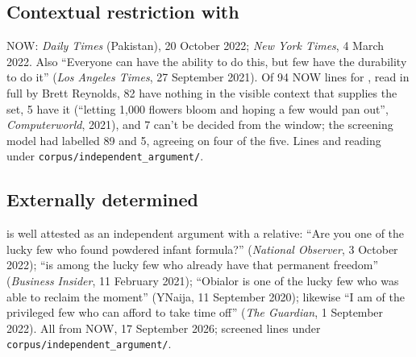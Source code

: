 \documentclass[12pt]{article}
\begin{document}
\subsection{Contextual restriction with }

NOW: \textit{Daily Times} (Pakistan), 20 October 2022; \textit{New York Times}, 4 March 2022. Also \enquote{Everyone can have the ability to do this, but few have the durability to do it} (\textit{Los Angeles Times}, 27 September 2021). Of 94 NOW lines for , read in full by Brett Reynolds, 82 have nothing in the visible context that supplies the set, 5 have it (\enquote{letting 1,000 flowers bloom and hoping a few would pan out}, \textit{Computerworld}, 2021), and 7 can't be decided from the window; the screening model had labelled 89 and 5, agreeing on four of the five. Lines and reading under \texttt{corpus/independent\_argument/}.

\subsection{Externally determined }

 is well attested as an independent argument with a relative: \enquote{Are you one of the lucky few who found powdered infant formula?} (\textit{National Observer}, 3 October 2022); \enquote{is among the lucky few who already have that permanent freedom} (\textit{Business Insider}, 11 February 2021); \enquote{Obialor is one of the lucky few who was able to reclaim the moment} (YNaija, 11 September 2020); likewise \enquote{I am of the privileged few who can afford to take time off} (\textit{The Guardian}, 1 September 2022). All from NOW, 17 September 2026; screened lines under \texttt{corpus/independent\_argument/}.

\printbibliography
\end{document}

